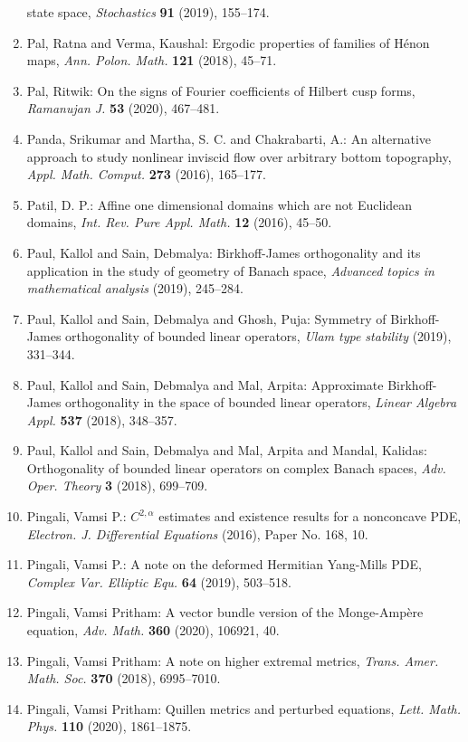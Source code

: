 \begin{enumerate}
state space, \emph{Stochastics} {\bf 91} (2019), 155--174.
\item Pal, Ratna and Verma, Kaushal: Ergodic properties of families of {H}\'{e}non maps, \emph{Ann. Polon. Math.} {\bf 121} (2018), 45--71.
\item Pal, Ritwik: On the signs of {F}ourier coefficients of {H}ilbert cusp
forms, \emph{Ramanujan J.} {\bf 53} (2020), 467--481.
\item Panda, Srikumar and Martha, S. C. and Chakrabarti, A.: An alternative approach to study nonlinear inviscid flow over
arbitrary bottom topography, \emph{Appl. Math. Comput.} {\bf 273} (2016), 165--177.
\item Patil, D. P.: Affine one dimensional domains which are not {E}uclidean
domains, \emph{Int. Rev. Pure Appl. Math.} {\bf 12} (2016), 45--50.
\item Paul, Kallol and Sain, Debmalya: Birkhoff-{J}ames orthogonality and its application in the
study of geometry of {B}anach space, \emph{Advanced topics in mathematical analysis} {\bf } (2019), 245--284.
\item Paul, Kallol and Sain, Debmalya and Ghosh, Puja: Symmetry of {B}irkhoff-{J}ames orthogonality of bounded linear
operators, \emph{Ulam type stability} {\bf } (2019), 331--344.
\item Paul, Kallol and Sain, Debmalya and Mal, Arpita: Approximate {B}irkhoff-{J}ames orthogonality in the space of
bounded linear operators, \emph{Linear Algebra Appl.} {\bf 537} (2018), 348--357.
\item Paul, Kallol and Sain, Debmalya and Mal, Arpita and Mandal,
Kalidas: Orthogonality of bounded linear operators on complex {B}anach
spaces, \emph{Adv. Oper. Theory} {\bf 3} (2018), 699--709.
\item Pingali, Vamsi P.: {$C^{2,\alpha}$} estimates and existence results for a
nonconcave {PDE}, \emph{Electron. J. Differential Equations} {\bf } (2016), Paper No. 168, 10.
\item Pingali, Vamsi P.: A note on the deformed {H}ermitian {Y}ang-{M}ills {PDE}, \emph{Complex Var. Elliptic Equ.} {\bf 64} (2019), 503--518.
\item Pingali, Vamsi Pritham: A vector bundle version of the {M}onge-{A}mp\`ere equation, \emph{Adv. Math.} {\bf 360} (2020), 106921, 40.
\item Pingali, Vamsi Pritham: A note on higher extremal metrics, \emph{Trans. Amer. Math. Soc.} {\bf 370} (2018), 6995--7010.
\item Pingali, Vamsi Pritham: Quillen metrics and perturbed equations, \emph{Lett. Math. Phys.} {\bf 110} (2020), 1861--1875.

\end{enumerate}
